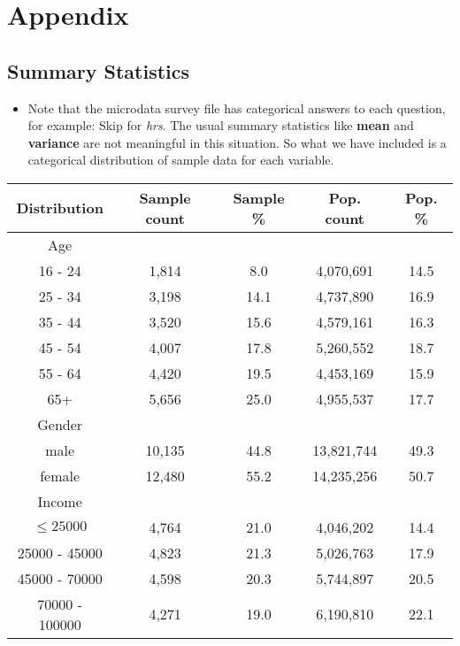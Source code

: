 \documentclass[11pt,twoside]{article}
\begin{document}
\newpage
\section{Appendix}
\subsection{Summary Statistics}
\begin{itemize}
\item Note that the microdata survey file has categorical answers to each question, for example: Skip for \textit{hrs}. The usual summary statistics like \textbf{mean} and \textbf{variance} are not meaningful in this situation. So what we have included is a categorical distribution of sample data for each variable.
\end{itemize}
\begin{center}
\begin{tabular}{c||c|c|c|c}
Distribution&Sample count&Sample \%&Pop. count&Pop. \%\\\hline
Age   &     &     &        &    \\
16 - 24 &    1,814       &      8.0       &     4,070,691    &     14.5\\
25 - 34 &    3,198       &      14.1      &     4,737,890    &     16.9\\
35 - 44 &    3,520       &      15.6      &     4,579,161    &     16.3\\
45 - 54 &    4,007       &      17.8      &     5,260,552    &     18.7\\
55 - 64 &    4,420       &      19.5      &     4,453,169    &     15.9\\
65+   &    5,656       &      25.0      &     4,955,537    &     17.7\\\hline
Gender   &    &      &     &    \\
male & 10,135       &     44.8      &      13,821,744    &  49.3\\
female & 12,480     &       55.2     &       14,235,256   &   50.7\\\hline
Income &&&&\\
$\leq 25000 $& 4,764       &         21.0     &       4,046,202   &    14.4\\
25000 - 45000&  4,823       &         21.3     &       5,026,763   &    17.9\\
45000 - 70000&  4,598       &         20.3     &       5,744,897   &    20.5\\
70000 - 100000&  4,271       &         19.0     &       6,190,810   &    22.1\\

\end{tabular}
\end{center}
\end{document}
